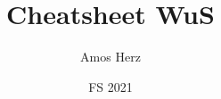 \documentclass[a4paper,9pt]{extarticle}
\title{\vspace{-1cm}Cheatsheet WuS\vspace{-0.65cm}}
\author{Amos Herz\vspace{-0.5cm}}
\date{FS 2021}
\newcommand\1{\mathbbm{1}}
\begin{document}
\begin{multicols*}{3}

\maketitle












\end{multicols*}
\begin{small}

\end{small}

%
\end{document}
